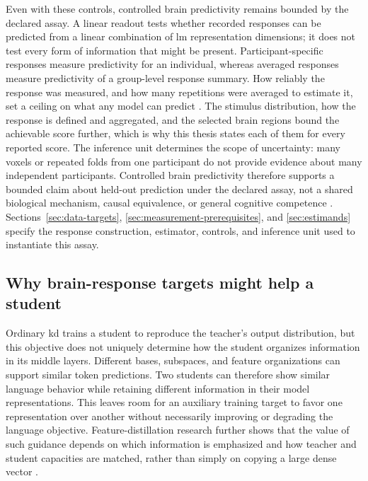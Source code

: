 Even with these controls, controlled brain predictivity remains bounded by the declared assay.
A linear readout tests whether recorded responses can be predicted from a linear combination of \ac{lm} representation dimensions; it does not test every form of information that might be present.
Participant-specific responses measure predictivity for an individual, whereas averaged responses measure predictivity of a group-level response summary.
How reliably the response was measured, and how many repetitions were averaged to estimate it, set a ceiling on what any model can predict \autocite{lage2019}.
The stimulus distribution, how the response is defined and aggregated, and the selected brain regions bound the achievable score further, which is why this thesis states each of them for every reported score.
The inference unit determines the scope of uncertainty: many voxels or repeated folds from one participant do not provide evidence about many independent participants.
Controlled brain predictivity therefore supports a bounded claim about held-out prediction under the declared assay, not a shared biological mechanism, causal equivalence, or general cognitive competence \autocite{jia2026}.
Sections~\ref{sec:data-targets}, \ref{sec:measurement-prerequisites}, and \ref{sec:estimands} specify the response construction, estimator, controls, and inference unit used to instantiate this assay.

\subsection{Why brain-response targets might help a student}
\label{sec:target-rationale}

Ordinary \ac{kd} trains a student to reproduce the teacher's output distribution, but this objective does not uniquely determine how the student organizes information in its middle layers.
Different bases, subspaces, and feature organizations can support similar token predictions.
Two students can therefore show similar language behavior while retaining different information in their model representations.
This leaves room for an auxiliary training target to favor one representation over another without necessarily improving or degrading the language objective.
Feature-distillation research further shows that the value of such guidance depends on which information is emphasized and how teacher and student capacities are matched, rather than simply on copying a large dense vector \autocite{saadi2025}.

